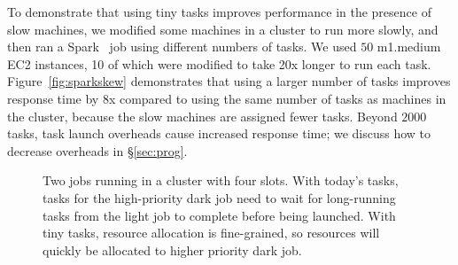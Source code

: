 
To demonstrate that using tiny tasks improves performance in
the presence of slow machines,
we modified some machines in a cluster to run more slowly, and then
ran a Spark~\cite{zaharia2010spark} job using different numbers of tasks. 
We used $50$ m1.medium EC2
instances, 10 of which were modified to take 20x longer to run each task.
Figure~\ref{fig:sparkskew} demonstrates that using a larger number of tasks
improves response time by 8x compared to using the same number
of tasks as machines in the cluster, because the slow machines are
assigned fewer tasks. Beyond $2000$ tasks, task launch overheads cause increased response time; we discuss
how to decrease overheads in \S\ref{sec:prog}.

\begin{figure}[t]
\centering
{}
\vspace{-0.1in}
\caption{Two jobs running in a cluster with four slots. With today's tasks,
tasks for the high-priority dark job need to wait for long-running tasks from the light job to
complete before being launched.
With tiny tasks, resource
allocation is fine-grained, so resources will quickly be allocated to
higher priority dark job.}
\vspace{-2ex}
\label{fig:slot_diagram}
\end{figure}


